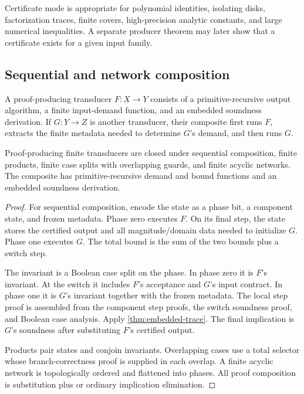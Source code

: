 Certificate mode is appropriate for polynomial identities, isolating disks,
factorization traces, finite covers, high-precision analytic constants, and
large numerical inequalities.  A separate producer theorem may later show
that a certificate exists for a given input family.

\subsection{Sequential and network composition}

A proof-producing transducer \(F:X\to Y\) consists of a primitive-recursive
output algorithm, a finite input-demand function, and an embedded soundness
derivation.  If \(G:Y\to Z\) is another transducer, their composite first runs
\(F\), extracts the finite metadata needed to determine \(G\)'s demand, and
then runs \(G\).

\begin{theorem}[Composition]
\label{thm:trace-composition}
Proof-producing finite transducers are closed under sequential composition,
finite products, finite case splits with overlapping guards, and finite
acyclic networks.  The composite has primitive-recursive demand and bound
functions and an embedded soundness derivation.
\end{theorem}

\begin{proof}
For sequential composition, encode the state as a phase bit, a component state,
and frozen metadata.  Phase zero executes \(F\).  On its final step, the state
stores the certified output and all magnitude/domain data needed to initialize
\(G\).  Phase one executes \(G\).  The total bound is the sum of the two bounds
plus a switch step.

The invariant is a Boolean case split on the phase.  In phase zero it is
\(F\)'s invariant.  At the switch it includes \(F\)'s acceptance and \(G\)'s
input contract.  In phase one it is \(G\)'s invariant together with the frozen
metadata.  The local step proof is assembled from the component step proofs,
the switch soundness proof, and Boolean case analysis.  Apply
\cref{thm:embedded-trace}.  The final implication is \(G\)'s soundness after
substituting \(F\)'s certified output.

Products pair states and conjoin invariants.  Overlapping cases use a total
selector whose branch-correctness proof is supplied in each overlap.  A finite
acyclic network is topologically ordered and flattened into phases.  All proof
composition is substitution plus  or ordinary implication
elimination.
\end{proof}

